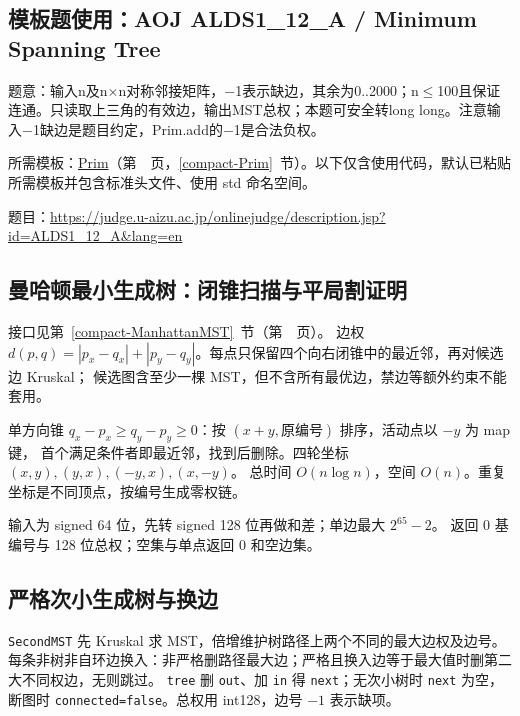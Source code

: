 

\newpage

\Needspace{363pt}

\subsection*{模板题使用：AOJ ALDS1\_12\_A / Minimum Spanning Tree}

\label{usage-example-316}

题意：输入n及n×n对称邻接矩阵，−1表示缺边，其余为0..2000；n$\le$100且保证连通。只读取上三角的有效边，输出MST总权；本题可安全转long long。注意输入−1缺边是题目约定，Prim.add的−1是合法负权。

所需模板：\hyperref[compact-Prim]{Prim}（第~\pageref{compact-Prim}~页，\ref{compact-Prim}~节）。以下仅含使用代码，默认已粘贴所需模板并包含标准头文件、使用 std 命名空间。

题目：\url{https://judge.u-aizu.ac.jp/onlinejudge/description.jsp?id=ALDS1_12_A&lang=en}



\newpage

\subsection{曼哈顿最小生成树：闭锥扫描与平局割证明}\label{knowledge-manhattan-mst}
接口见第~\ref{compact-ManhattanMST}~节（第~\pageref{compact-ManhattanMST}~页）。
边权 $d(p,q)=|p_x-q_x|+|p_y-q_y|$。每点只保留四个向右闭锥中的最近邻，再对候选边 Kruskal；
候选图含至少一棵 MST，但不含所有最优边，禁边等额外约束不能套用。

单方向锥 $q_x-p_x\ge q_y-p_y\ge0$：按 $(x+y,\text{原编号})$ 排序，活动点以 $-y$ 为 map 键，
首个满足条件者即最近邻，找到后删除。四轮坐标 $(x,y),(y,x),(-y,x),(x,-y)$。
总时间 $O(n\log n)$，空间 $O(n)$。重复坐标是不同顶点，按编号生成零权链。

输入为 signed 64 位，先转 signed 128 位再做和差；单边最大 $2^{65}-2$。
返回 0 基编号与 128 位总权；空集与单点返回 0 和空边集。


\subsection{严格次小生成树与换边}\label{knowledge-second-mst}
\texttt{SecondMST} 先 Kruskal 求 MST，倍增维护树路径上两个不同的最大边权及边号。
每条非树非自环边换入：非严格删路径最大边；严格且换入边等于最大值时删第二大不同权边，无则跳过。
\texttt{tree} 删 \texttt{out}、加 \texttt{in} 得 \texttt{next}；无次小树时 \texttt{next} 为空，
断图时 \texttt{connected=false}。总权用 int128，边号 $-1$ 表示缺项。


